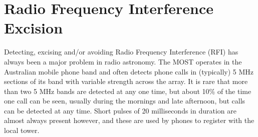 \section{Radio Frequency Interference Excision}  

Detecting, excising and/or avoiding Radio Frequency Interference (RFI) has always been a major problem in radio astronomy. The MOST operates in the Australian mobile phone band and often detects phone calls in (typically) 5 MHz sections of its band with variable strength across the array. It is rare that more than two 5 MHz bands are detected at any one time, but about 10\% of the time one call can be seen, usually during the mornings and late afternoon, but calls can be detected at any time. Short pulses of 20 milliseconds in duration are almost always present however, and these are used by phones to register with the local tower.
